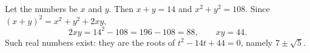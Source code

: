Let the numbers be $x$ and $y$. Then $x+y=14$ and $x^2+y^2=108$. Since $(x+y)^2=x^2+y^2+2xy$,
\[
2xy=14^2-108=196-108=88,\qquad xy=\boxed{44}.
\]
Such real numbers exist: they are the roots of $t^2-14t+44=0$, namely $7\pm\sqrt5$.
